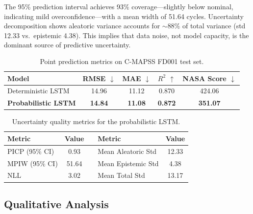 \documentclass[runningheads]{llncs}
\begin{document}
The 95\% prediction interval achieves 93\% coverage---slightly below nominal, indicating mild overconfidence---with a mean width of 51.64 cycles.
Uncertainty decomposition shows aleatoric variance accounts for ${\sim}$88\% of total variance (std 12.33 vs.\ epistemic 4.38).
This implies that data noise, not model capacity, is the dominant source of predictive uncertainty.

\begin{table}[t]
\caption{Point prediction metrics on C-MAPSS FD001 test set.}\label{tab:point}
\centering
\begin{tabular}{lcccc}
\toprule
Model & RMSE $\downarrow$ & MAE $\downarrow$ & $R^2$ $\uparrow$ & NASA Score $\downarrow$ \\
\midrule
Deterministic LSTM & 14.96 & 11.12 & 0.870 & 424.06 \\
\textbf{Probabilistic LSTM} & \textbf{14.84} & \textbf{11.08} & \textbf{0.872} & \textbf{351.07} \\
\bottomrule
\end{tabular}
\end{table}

\begin{table}[t]
\caption{Uncertainty quality metrics for the probabilistic LSTM.}\label{tab:uq}
\centering
\begin{tabular}{lcclc}
\toprule
Metric & Value & & Metric & Value \\
\midrule
PICP (95\% CI) & 0.93 & & Mean Aleatoric Std & 12.33 \\
MPIW (95\% CI) & 51.64 & & Mean Epistemic Std & 4.38 \\
NLL & 3.02 & & Mean Total Std & 13.17 \\
\bottomrule
\end{tabular}
\end{table}

\subsection{Qualitative Analysis}
\end{document}
